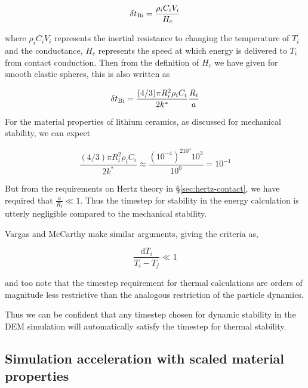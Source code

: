 \begin{equation}
	\delta t_{\mathrm{Bi}} = \frac{\rho_i C_i V_i}{H_c}
\end{equation}

where $\rho_i C_i V_i$ represents the inertial resistance to changing the temperature of $T_i$ and the conductance, $H_c$ represents the speed at which energy is delivered to $T_i$ from contact conduction. Then from the definition of $H_c$ we have given for smooth elastic spheres, this is also written as

\begin{equation}
	\delta t_{\mathrm{Bi}} = \frac{(4/3)\pi R_i^2\rho_i C_i}{2k^*}\frac{R_i}{a}
\end{equation}

For the material properties of lithium ceramics, as discussed for mechanical stability, we can expect

\begin{equation*}
	\frac{(4/3)\pi R_i^2\rho_i C_i}{2k^*} \approx \frac{(10^{-4})^210^{4}10^3}{10^0} = 10^{-1}
\end{equation*}

But from the requirements on Hertz theory in \S\ref{sec:hertz-contact}, we have required that $\frac{a}{R_i} \ll 1$. Thus the timestep for stability in the energy calculation is utterly negligible compared to the mechanical stability.

Vargas and McCarthy\cite{Vargas2001} make similar arguments, giving the criteria as,

\begin{equation}
	\frac{\mathrm{d}T_i}{T_i - T_j} \ll 1
\end{equation}

and too note that the timestep requirement for thermal calculations are orders of magnitude less restrictive than the analogous restriction of the particle dynamics.

Thus we can be confident that any timestep chosen for dynamic stability in the DEM simulation will automatically satisfy the timestep for thermal stability. 





\subsection{Simulation acceleration with scaled material properties}


